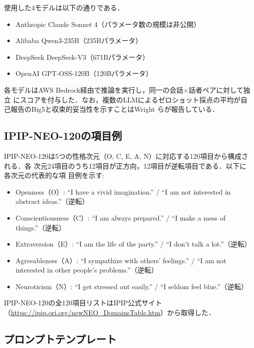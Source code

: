 \documentclass[dvipdfmx,11pt,a4paper]{bxjsarticle}
\renewcommand{\_}{\paperorigunderscore\allowbreak}%
\begin{document}
使用した4モデルは以下の通りである．


\begin{itemize}
  \item Anthropic Claude Sonnet 4（パラメータ数の規模は非公開）
  \item Alibaba Qwen3-235B（235Bパラメータ）
  \item DeepSeek DeepSeek-V3（671Bパラメータ）
  \item OpenAI GPT-OSS-120B（120Bパラメータ）
\end{itemize}

各モデルはAWS Bedrock経由で推論を実行し，同一の会話$\times$話者ペアに対して独立
にスコアを付与した．なお，複数のLLMによるゼロショット採点の平均が自
己報告のBig5と収束的妥当性を示すことはWright ら\cite{wright2026}が報告している．


\subsection{IPIP-NEO-120の項目例}
\label{sec:appendix_ipip}

IPIP-NEO-120は5つの性格次元（O, C, E, A, N）に対応する120項目から構成される．各
次元24項目のうち12項目が正方向，12項目が逆転項目である．以下に各次元の代表的な項
目例を示す:

\begin{itemize}
  \item Openness（O）: ``I have a vivid imagination.'' / ``I am not interested in abstract ideas.''（逆転）
  \item Conscientiousness（C）: ``I am always prepared.'' / ``I make a mess of things.''（逆転）
  \item Extraversion（E）: ``I am the life of the party.'' / ``I don't talk a lot.''（逆転）
  \item Agreeableness（A）: ``I sympathize with others' feelings.'' / ``I am not interested in other people's problems.''（逆転）
  \item Neuroticism（N）: ``I get stressed out easily.'' / ``I seldom feel blue.''（逆転）
\end{itemize}

IPIP-NEO-120の全120項目リストはIPIP公式サイト（\url{https://ipip.ori.org/newNEO_DomainsTable.htm}）から取得した．

\subsection{プロンプトテンプレート}
\label{sec:appendix_prompt}
\end{document}
